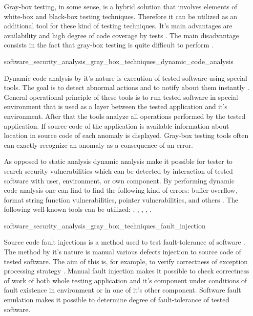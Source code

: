 %
Gray-box testing, in some sense, is a hybrid solution that involves elements of white-box and black-box testing techniques. 
%
Therefore it can be utilized as an additional tool for these kind of testing techniques. 
%
It's main advantages are availability and high degree of code coverage by tests . 
%
The main disadvantage consists in the fact that gray-box testing is quite difficult to perform . 


	{software_security_analysis_gray_box_techniques_dynamic_code_analysis}

%
Dynamic code analysis by it's nature is execution of tested software using special tools. 
%
The goal is to detect abnormal actions and to notify about them instantly . 
%
General operational principle of these tools is to run tested software in special environment that is used as a layer between the tested application and it's environment. 
%
After that the tools analyze all operations performed by the tested application. 
%
If source code of the application is available information about location in source code of each anomaly is displayed. 
%
Gray-box testing tools often can exactly recognize an anomaly as a consequence of an error. 

%
As opposed to static analysis dynamic analysis make it possible for tester to search security vulnerabilities which can be detected by interaction of tested software with user, environment, or own component. 
%
By performing dynamic code analysis one can find to find the following kind of errors: buffer overflow, format string function vulnerabilities, pointer vulnerabilities, and others . 
%
The following well-known tools can be utilized:  ,  ,  ,  ,  . 


	{software_security_analysis_gray_box_techniques_fault_injection}

%
Source code fault injections is a method used to test fault-tolerance of software . 
%
The method by it's nature is manual various defects injection to source code of tested software. 
%
The aim of this is, for example, to verify correctness of exception processing strategy . 
%
Manual fault injection makes it possible to check correctness of work of both whole testing application and it's component under conditions of fault existence in environment or in one of it's other component. 
%
Software fault emulation makes it possible to determine degree of fault-tolerance of tested software. 

